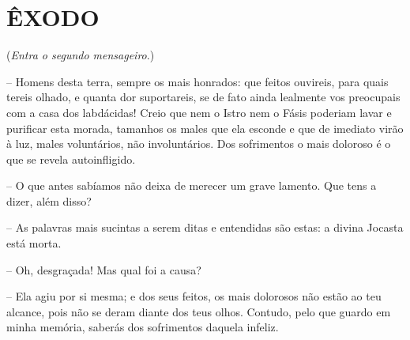 \section{ÊXODO}

(\emph{Entra o segundo mensageiro}.)

 --   Homens desta terra, sempre os mais honrados: que feitos ouvireis, para
quais tereis olhado, e quanta dor suportareis, se de fato ainda lealmente
vos preocupais com a casa dos labdácidas! Creio que nem o Istro nem o
Fásis poderiam lavar e purificar esta morada, tamanhos os males que ela
esconde e que de imediato virão à luz, males  voluntários, não
involuntários. Dos sofrimentos o mais doloroso é o que se revela
autoinfligido.

 --   O que antes sabíamos não deixa de merecer um grave lamento. Que tens a
dizer, além disso?

 --   As palavras mais sucintas a serem ditas e entendidas são estas: a divina
Jocasta está morta.

 --   Oh, desgraçada! Mas qual foi a causa?

 --   Ela agiu por si mesma; e dos seus feitos, os mais dolorosos não estão ao
teu alcance, pois não se deram diante dos teus olhos. Contudo, pelo que
guardo em minha  memória, saberás dos sofrimentos daquela infeliz.

